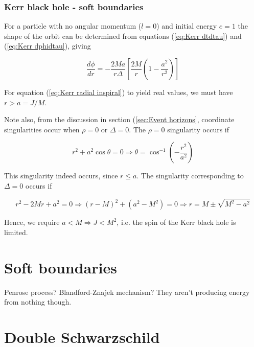 \documentclass{article}
\begin{document}
\subsubsection{Kerr black hole - soft boundaries}

For a particle with no angular momentum ($l=0$) and initial energy $e=1$ the shape of the orbit can be determined from equations (\ref{eq:Kerr dtdtau}) and (\ref{eq:Kerr dphidtau}), giving

\begin{equation}
    \frac{d\phi}{dr} = -\frac{2 M a}{r \Delta} \left[   \frac{2M}{r} \left(  1-\frac{a^2}{r^2}   \right)    \right]
\end{equation}\label{eq:Kerr radial inspiral}

For equation (\ref{eq:Kerr radial inspiral}) to yield real values, we must have $r>a=J/M$.

Note also, from the discussion in section (\ref{sec:Event horizons}, coordinate singularities occur when $\rho=0$ or $\Delta = 0$. The $\rho=0$ singularity occurs if

\begin{equation}
    r^2+a^2 \cos{\theta} = 0
    \Rightarrow
    \theta=\cos^{-1}{\left(-\frac{r^2}{a^2}\right)}
\end{equation}

This singularity indeed occurs, since $r \leq a$. The singularity corresponding to $\Delta=0$ occurs if

\begin{equation}
    r^2-2Mr+a^2=0
    \Rightarrow
    (r-M)^2+(a^2-M^2)=0
    
    \Rightarrow
    r=M\pm\sqrt{M^2-a^2}\label{eq:Kerr event horizon}
\end{equation}

Hence, we require $a<M\Rightarrow J < M^2$, i.e. the spin of the Kerr black hole is limited.


\section{Soft boundaries}

Penrose process? Blandford-Znajek mechanism? They aren't producing energy from nothing though.



\section{Double Schwarzschild}
\end{document}
